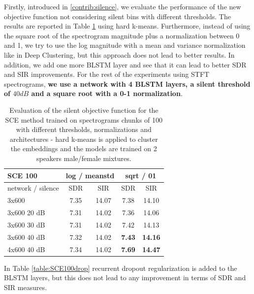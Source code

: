 \documentclass[master, tikz, final,11pt, dvipdfmx]{iscs-thesis}
\begin{document}
Firstly, introduced in \autoref{contrib:silence}, we evaluate the performance of the new objective function not considering silent bins with different thresholds. The results are reported in Table \ref{table:SCEsilence} using hard k-means. Furthermore, instead of using the square root of the spectrogram magnitude plus a normalization between 0 and 1, we try to use the log magnitude with a mean and variance normalization like in Deep Clustering, but this approach does not lead to better results. In addition, we add one more BLSTM layer and see that it can lead to better SDR and SIR improvements. For the rest of the experiments using STFT spectrograms, \textbf{we use a network with 4 BLSTM layers, a silent threshold of $40dB$ and a square root with a 0-1 normalization}.


\begin{table}[h!]
\centering
\begin{tabular}{l|c|c|c|c}
SCE 100 & \multicolumn{2}{c|}{log / meanstd } & \multicolumn{2}{c}{sqrt / 01} \\ 
\hline 
network / silence & SDR & SIR & SDR & SIR  \\ 
\hline 
3x600 & 7.35 & 14.07 & 7.38 & 14.10 \\ 
\hline 
\hline 
3x600 20 dB & 7.31 & 14.02 & 7.36 & 14.06 \\ 
3x600 30 dB & 7.31 & 14.02 & 7.42 & 14.13 \\ 
3x600 40 dB & 7.32 & 14.02 & \textbf{7.43} & \textbf{14.16} \\ 
\hline 
\hline 

4x600 40 dB & 7.34 & 14.02 & \cellcolor{green}\textbf{7.69} &
 \cellcolor{green}\textbf{14.47} \\ 
\end{tabular}
\caption[Evaluation of the silent objective function for the SCE method trained on spectrograms chunks of size 100]{Evaluation of the silent objective function for the SCE method trained on spectrograms chunks of 100 with different thresholds, normalizations and architectures - hard k-means is applied to cluster the embeddings and the models are trained on 2 speakers male/female mixtures.}
\label{table:SCEsilence}
\end{table}

In Table \ref{table:SCE100drop} recurrent dropout regularization is added to the BLSTM layers, but this does not lead to any improvement in terms of SDR and SIR measures.
\end{document}
